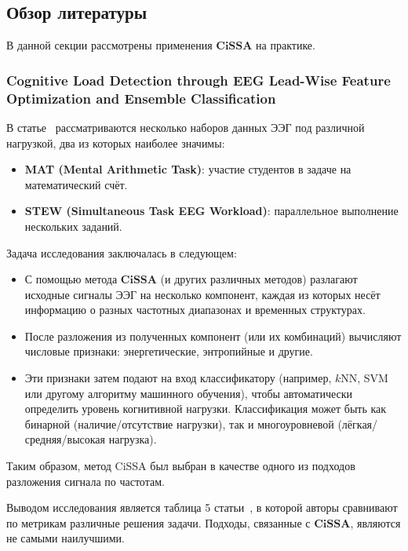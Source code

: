 \documentclass[a4paper, 11pt]{article}
\newcommand{\CISSA}{\textbf{CiSSA}}
\begin{document}
\subsection{Обзор литературы}


В данной секции рассмотрены применения $\CISSA$ на практике.

\subsubsection{Cognitive Load Detection through EEG Lead-Wise Feature Optimization and Ensemble Classification}

В статье~\cite{cognitive} рассматриваются несколько наборов данных ЭЭГ под различной нагрузкой, два из которых наиболее значимы:

\begin{itemize}
	\item \textbf{MAT (Mental Arithmetic Task)}: участие студентов в задаче на математический счёт.
	\item \textbf{STEW (Simultaneous Task EEG Workload)}: параллельное выполнение нескольких заданий.
\end{itemize}

Задача исследования заключалась в следующем:

\begin{itemize}
	\item С помощью метода $\CISSA$ (и других различных методов) разлагают исходные сигналы ЭЭГ на несколько компонент, каждая из которых несёт информацию о разных частотных диапазонах и временных структурах.
	\item После разложения из полученных компонент (или их комбинаций) вычисляют числовые признаки: энергетические, энтропийные и другие.
	\item Эти признаки затем подают на вход классификатору (например, $k$NN, SVM или другому алгоритму машинного обучения), чтобы автоматически определить уровень когнитивной нагрузки. Классификация может быть как бинарной (наличие/отсутствие нагрузки), так и многоуровневой (лёгкая/средняя/высокая нагрузка).
\end{itemize}

Таким образом, метод CiSSA был выбран в качестве одного из подходов разложения сигнала по частотам.

Выводом исследования является таблица 5 статьи~\cite{cognitive}, в которой авторы сравнивают по метрикам различные решения задачи. Подходы, связанные с $\CISSA$, являются не самыми наилучшими.
\end{document}

